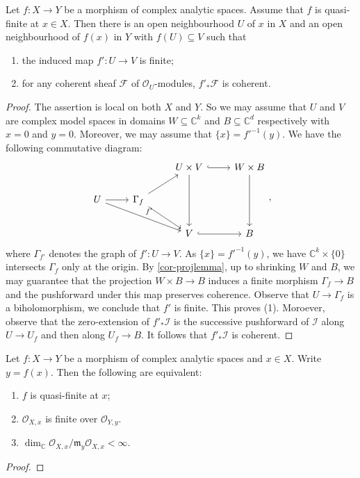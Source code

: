 \begin{proposition}\label{prop-quasifinitefinite}
    Let $f:X\rightarrow Y$ be a morphism of complex analytic spaces. Assume that $f$ is quasi-finite at $x\in X$. Then there is an open neighbourhood $U$ of $x$ in $X$ and an open neighbourhood of $f(x)$ in $Y$ with $f(U)\subseteq V$ such that 
    \begin{enumerate}
        \item the induced map $f':U\rightarrow V$ is finite;
        \item for any coherent sheaf $\mathcal{F}$ of $\mathcal{O}_U$-modules, $f'_*\mathcal{F}$ is coherent. 
    \end{enumerate}
\end{proposition}
\begin{proof}
    The assertion is local on both $X$ and $Y$. So we may assume that $U$ and $V$ are complex model spaces in domains $W\subseteq \mathbb{C}^k$ and $B\subseteq \mathbb{C}^d$ respectively with $x=0$ and $y=0$. Moreover, we may assume that $\{x\}=f'^{-1}(y)$. We have the following commutative diagram:
    \[
        \begin{tikzcd}
            &                                & U\times V \arrow[dd] \arrow[r, hook] & W\times B \arrow[dd] \\
U \arrow[r] \arrow[rrd,"f'"] & \Gamma_f \arrow[rd] \arrow[ru] &                                      &                      \\
            &                                & V \arrow[r, hook]                    & B                   
\end{tikzcd},
    \]
    where $\Gamma_{f'}$ denotes the graph of $f':U\rightarrow V$. As $\{x\}=f'^{-1}(y)$, we have $\mathbb{C}^k\times\{0\}$ intersects $\Gamma_f$ only at the origin. By \cref{cor-projlemma}, up to shrinking $W$ and $B$, we may guarantee that the projection $W\times B\rightarrow B$ induces a finite morphism $\Gamma_f\rightarrow B$ and the pushforward under this map preserves coherence. Observe that $U\rightarrow \Gamma_f$ is a biholomorphism, we conclude that $f'$ is finite. This proves (1). Moroever, observe that the zero-extension of $f'_*\mathcal{I}$ is the successive pushforward of $\mathcal{I}$ along $U\rightarrow U_f$ and then along $U_f\rightarrow B$. It follows that  $f'_*\mathcal{I}$ is coherent.
\end{proof}

\begin{theorem}
    Let $f:X\rightarrow Y$ be a morphism of complex analytic spaces and $x\in X$. Write $y=f(x)$. Then the following are equivalent:
    \begin{enumerate}
        \item $f$ is quasi-finite at $x$;
        \item $\mathcal{O}_{X,x}$ is finite over $\mathcal{O}_{Y,y}$.
        \item $\dim_{\mathbb{C}}\mathcal{O}_{X,x}/\mathfrak{m}_{y}\mathcal{O}_{X,x}<\infty$.
    \end{enumerate}
\end{theorem}
\begin{proof}

\end{proof}


